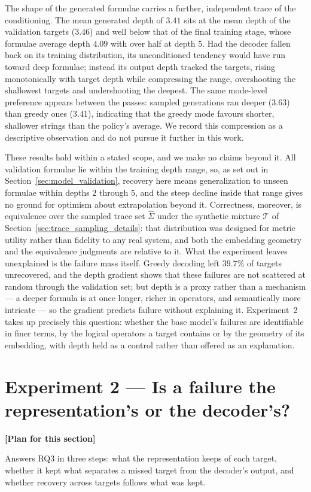 \documentclass[titlepage,a4paper,11pt]{report}
\newenvironment{RSplan}{\par\medskip\color{orange!85!black}\noindent\textbf{[Plan for this section]}\par}{\par\medskip}
\begin{document}
    The shape of the generated formulae carries a further, independent trace of the conditioning. The mean generated depth of $3.41$ sits at the mean depth of the validation targets ($3.46$) and well below that of the final training stage, whose formulae average depth $4.09$ with over half at depth $5$. Had the decoder fallen back on its training distribution, its unconditioned tendency would have run toward deep formulae; instead its output depth tracked the targets, rising monotonically with target depth while compressing the range, overshooting the shallowest targets and undershooting the deepest. The same mode-level preference appears between the passes: sampled generations ran deeper ($3.63$) than greedy ones ($3.41$), indicating that the greedy mode favours shorter, shallower strings than the policy's average. We record this compression as a descriptive observation and do not pursue it further in this work.
    
    These results hold within a stated scope, and we make no claims beyond it. All validation formulae lie within the training depth range, so, as set out in Section~\ref{sec:model_validation}, recovery here means generalization to unseen formulae within depths $2$ through $5$, and the steep decline inside that range gives no ground for optimism about extrapolation beyond it. Correctness, moreover, is equivalence over the sampled trace set $\widehat\Sigma$ under the synthetic mixture $\mathcal{T}$ of Section~\ref{sec:trace_sampling_details}: that distribution was designed for metric utility rather than fidelity to any real system, and both the embedding geometry and the equivalence judgments are relative to it. What the experiment leaves unexplained is the failure mass itself. Greedy decoding left $39.7\%$ of targets unrecovered, and the depth gradient shows that these failures are not scattered at random through the validation set; but depth is a proxy rather than a mechanism --- a deeper formula is at once longer, richer in operators, and semantically more intricate --- so the gradient predicts failure without explaining it. Experiment~2 takes up precisely this question: whether the base model's failures are identifiable in finer terms, by the logical operators a target contains or by the geometry of its embedding, with depth held as a control rather than offered as an explanation.


    \section{Experiment 2 --- Is a failure the representation's or the decoder's?}\label{sec:exp_diagnosis}
    \begin{RSplan}
    Answers RQ3 in three steps: what the representation keeps of each target, whether it kept what separates a missed target from the decoder's output, and whether recovery across targets follows what was kept.
    \end{RSplan}
\end{document}
